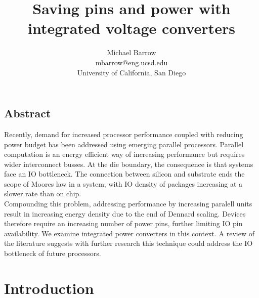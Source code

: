 \documentclass[letterpaper,twocolumn,10pt]{article}
\begin{document}
\date{}

\title{\Large \bf Saving pins and power with integrated voltage converters}

\author{
{\rm Michael Barrow}\\
mbarrow@eng.ucsd.edu\\
University of California, San Diego
}

\maketitle

\thispagestyle{empty}


\subsection*{Abstract}
Recently, demand for increased processor performance coupled with reducing power budget has been addressed using emerging parallel processors. Parallel computation is an energy efficient way of increasing performance but requires wider interconnect busses. At the die boundary, the consequence is that systems face an IO bottleneck. The connection between silicon and substrate ends the scope of Moores law in a system, with IO density of packages increasing at a slower rate than on chip.\\
Compounding this problem, addressing performance by increasing paralell units result in increasing energy density due to the end of Dennard scaling. Devices therefore require an increasing number of power pins, further limiting IO pin availability. %
We examine integrated power converters in this context. A review of the literature suggests with further research this technique could address the IO bottleneck of future processors.%

\section{Introduction}

\end{document}
